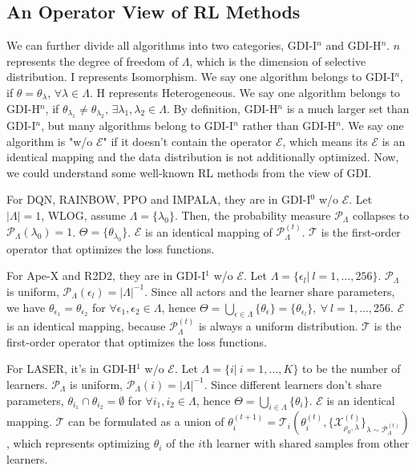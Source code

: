 \documentclass[nohyperref]{article}
\theoremstyle{plain}
\begin{document}
\subsection{An Operator View of RL Methods}
\label{sec: An Operator View of RL Methods}
We can further divide all algorithms into two categories, GDI-I$^n$ and GDI-H$^n$.
$n$ represents the degree of freedom of $\Lambda$, which is the dimension of selective distribution.
I represents Isomorphism. 
We say one algorithm belongs to GDI-I$^n$, if $\theta = \theta_{\lambda}, \, \forall \lambda \in \Lambda$.
H represents Heterogeneous.
We say one algorithm belongs to GDI-H$^n$, if $\theta_{\lambda_1} \neq \theta_{\lambda_2}, \, \exists \lambda_1, \lambda_2 \in \Lambda$.
By definition, GDI-H$^n$ is a much larger set than GDI-I$^n$, but many algorithms belong to GDI-I$^n$ rather than GDI-H$^n$.
We say one algorithm is "w/o $\mathcal{E}$" if it doesn't contain the operator $\mathcal{E}$, which means its $\mathcal{E}$ is an identical mapping and the data distribution is not additionally optimized. 
Now, we could understand some well-known RL methods from the view of GDI.


For DQN, RAINBOW, PPO and IMPALA, they are in GDI-I$^0$ w/o $\mathcal{E}$. Let $|\Lambda| = 1$, WLOG, assume $\Lambda = \{\lambda_0\}$.
Then, the probability measure $\mathcal{P}_{\Lambda}$ collapses to $\mathcal{P}_{\Lambda} (\lambda_0) = 1$. 
$\Theta = \{\theta_{\lambda_0}\}$.
$\mathcal{E}$ is an identical mapping of $\mathcal{P}_{\Lambda}^{(t)}$.
$\mathcal{T}$ is the first-order operator that optimizes the loss functions.

For Ape-X and R2D2, they are in GDI-I$^1$ w/o $\mathcal{E}$. 
Let $\Lambda = \{\epsilon_l |\ l = 1, \dots, 256\}$.
$\mathcal{P}_{\Lambda}$ is uniform, $\mathcal{P}_{\Lambda} (\epsilon_l) = |\Lambda|^{-1}$.
Since all actors and the learner share parameters, we have $\theta_{\epsilon_1} = \theta_{\epsilon_2}$ for $\forall \epsilon_1, \epsilon_2 \in \Lambda$, hence $\Theta = \bigcup_{\epsilon \in \Lambda} \{\theta_{\epsilon}\} = \{\theta_{\epsilon_l}\}, \ \forall\ l = 1,\dots, 256$.
$\mathcal{E}$ is an identical mapping, because $\mathcal{P}_{\Lambda}^{(t)}$ is always a uniform distribution.
$\mathcal{T}$ is the first-order operator that optimizes the loss functions.

For LASER, it's in GDI-H$^1$ w/o $\mathcal{E}$. 
Let $\Lambda = \{i |\ i = 1, \dots, K\}$ to be the number of learners.
$\mathcal{P}_{\Lambda}$ is uniform, $\mathcal{P}_{\Lambda} (i) = |\Lambda|^{-1}$.
Since different learners don't share parameters, $\theta_{i_1} \cap \theta_{i_2} = \emptyset$ for $\forall i_1, i_2 \in \Lambda$, hence $\Theta = \bigcup_{i \in \Lambda} \{\theta_i\}$.
$\mathcal{E}$ is an identical mapping.
$\mathcal{T}$ can be formulated as a union of $\theta^{(t+1)}_i 
= \mathcal{T}_{i}( \theta^{(t)}_i, \{\mathcal{X}^{(t)}_{\rho_0, \lambda}\}_{\lambda \sim \mathcal{P}^{(t)}_{\Lambda}} )$, 
which represents optimizing $\theta_i$ of the $i$th learner with shared samples from other learners.
\end{document}
